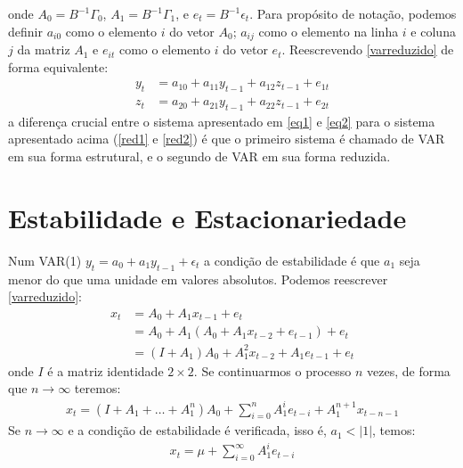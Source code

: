 \documentclass[11pt,a4paper]{article}
\begin{document}
\noindent
onde $A_0 = B^{-1}\Gamma_0$, $A_1 = B^{-1}\Gamma_1$, e $e_t = B^{-1}\epsilon_t$. Para propósito de notação, podemos definir $a_{i0}$ como o elemento $i$ do vetor $A_0$; $a_{ij}$ como o elemento na linha $i$ e coluna $j$ da matriz $A_1$ e $e_{it}$ como o elemento $i$ do vetor $e_{t}$. Reescrevendo \ref{varreduzido} de forma equivalente:
\begin{align} \label{red1}
y_t &= a_{10} + a_{11}y_{t-1} + a_{12}z_{t-1} + e_{1t} \\ \label{red2}
z_t &= a_{20} + a_{21}y_{t-1} + a_{22}z_{t-1} + e_{2t}
\end{align}
\noindent 
a diferença crucial entre o sistema apresentado em \ref{eq1} e \ref{eq2} para o sistema apresentado acima (\ref{red1} e \ref{red2}) é que o primeiro sistema é chamado de VAR em sua forma estrutural, e o segundo de VAR em sua forma reduzida.


\section*{Estabilidade e Estacionariedade}

Num VAR(1) $y_t = a_0 + a_1 y_{t-1} + \epsilon_t$ a condição de estabilidade é que $a_1$ seja menor do que uma unidade em valores absolutos. Podemos reescrever \ref{varreduzido}:
\begin{align*}
x_t &= A_0 + A_1 x_{t-1} + e_t \\
    &= A_0 + A_1 (A_0 + A_1 x_{t-2} + e_{t-1}) + e_t \\
    &= (I + A_1)A_0 + A_1^{2}x_{t-2} + A_1 e_{t-1} + e_t
\end{align*}
\noindent
onde $I$ é a matriz identidade $2\times 2$. Se continuarmos o processo $n$ vezes, de forma que $n \rightarrow \infty$ teremos:
\begin{align*}
x_t = (I + A_1 + \dots + A_1^n)A_0 + \sum_{i=0}^{n} A_{1}^{i} e_{t-i} + A_1 ^{n+1} x_{t-n-1}
\end{align*}
Se $n \rightarrow \infty$ e a condição de estabilidade é verificada, isso é, $a_1 < |1|$, temos:
\begin{align}
x_t = \mu + \sum_{i=0}^{\infty}A_{1}^{i}e_{t-i}
\end{align}
\end{document}
